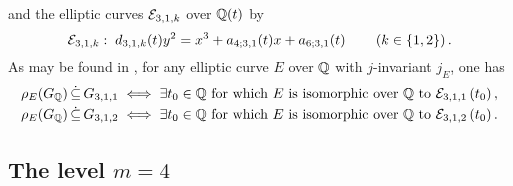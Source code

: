 and the elliptic curves $\mathcal{E}_{3,1,k}$ over $\mathbb{Q}(t)$ by
\[
\mathcal{E}_{3,1,k} : \; d_{3,1,k}(t) y^2 = x^3 + a_{4;3,1}(t) x + a_{6;3,1}(t) \quad\quad \left( k \in \{1, 2 \} \right).
\]
As may be found in \cite{zywina}, for any elliptic curve $E$ over $\mathbb{Q}$ with $j$-invariant $j_E$, one has
\[
\begin{split}
\rho_{E}(G_{\mathbb{Q}}) \, \dot\subseteq \, G_{3,1,1} \; &\Longleftrightarrow \; \exists t_0 \in \mathbb{Q} \text{ for which } E \text{ is isomorphic over $\mathbb{Q}$ to } \mathcal{E}_{3,1,1}\left( t_0 \right), \\
\rho_{E}(G_{\mathbb{Q}}) \, \dot\subseteq \, G_{3,1,2} \; &\Longleftrightarrow \; \exists t_0 \in \mathbb{Q} \text{ for which } E \text{ is isomorphic over $\mathbb{Q}$ to } \mathcal{E}_{3,1,2}\left( t_0 \right).
\end{split}
\]

\medskip

\subsection{The level \texorpdfstring{$m=4$}.}

